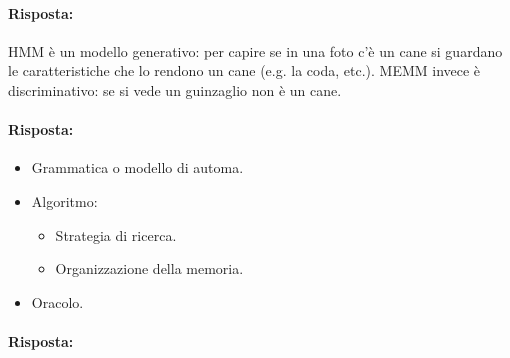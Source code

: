 \paragraph{Risposta:} HMM è un modello generativo: per capire se in una foto c'è un cane si guardano le caratteristiche che lo rendono un cane (e.g. la coda, etc.). MEMM invece è discriminativo: se si vede un guinzaglio non è un cane. 


\paragraph{Risposta:}

\begin{itemize}
  \item Grammatica o modello di automa. 
  \item Algoritmo:
    \begin{itemize}
      \item Strategia di ricerca. 
      \item Organizzazione della memoria.
    \end{itemize}
  \item Oracolo.
\end{itemize}


\paragraph{Risposta:}

